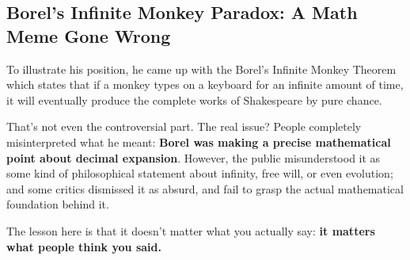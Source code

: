 \subsection{Borel’s Infinite Monkey Paradox: A Math Meme Gone Wrong}

To illustrate his position, he came up with the Borel’s Infinite Monkey Theorem which states that if a monkey types on a keyboard for an infinite amount of time, it will eventually produce the complete works of Shakespeare by pure chance.

That’s not even the controversial part. The real issue? People completely misinterpreted what he meant: \textbf{Borel was making a precise mathematical point about decimal expansion}. However, the public misunderstood it as some kind of philosophical statement about infinity, free will, or even evolution; and some critics dismissed it as absurd, and fail to grasp the actual mathematical foundation behind it.

The lesson here is that it doesn’t matter what you actually say: \textbf{it matters what people think you said.} 